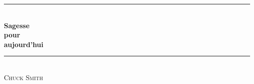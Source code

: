 
\newcommand{\HRule}{\rule{\linewidth}{0.2mm}}

\begin{titlepage}
\begin{center}
\mbox{}
\vfill
\HRule \\[0.4cm]
{ \LARGE \bfseries Sagesse\\ pour\\ aujourd'hui}\\[0.4cm]

\HRule \\[1.5cm]
\textsc{\Large Chuck Smith}\\[1.5cm]
\vfill
\mbox{}
\end{center}
\end{titlepage}

